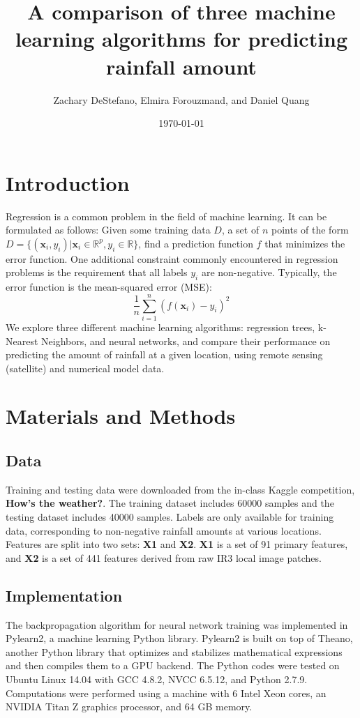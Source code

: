 \documentclass[12pt] {article}
\begin{document}
\title{A comparison of three machine learning algorithms for predicting rainfall amount}
\author{Zachary DeStefano, Elmira Forouzmand, and Daniel Quang}
\date \today
\maketitle
\thispagestyle{empty}
\bigskip
\pagebreak
\setcounter{page}{1}
\section{Introduction}
Regression is a common problem in the field of machine learning. It can be formulated as follows: Given some training data $D$, a set of $n$ points of the form $D=\{(\mathbf{x}_i,y_i) | \mathbf{x}_i \in \mathbb{R}^p, y_i \in \mathbb{R} \}$, find a prediction function $f$ that minimizes the error function. One additional constraint commonly encountered in regression problems is the requirement that all labels $y_i$ are non-negative. Typically, the error function is the mean-squared error (MSE): 
$$\frac{1}{n}\sum_{i=1}^n\left(f(\mathbf{x}_i)-y_i\right)^2$$
We explore three different machine learning algorithms: regression trees, k-Nearest Neighbors, and neural networks, and compare their performance on predicting the amount of rainfall at a given location, using remote sensing (satellite) and numerical model data. 
\section{Materials and Methods}
\subsection{Data}
Training and testing data were downloaded from the in-class Kaggle competition, \textbf{How's the weather?}. The training dataset includes 60000 samples and the testing dataset includes 40000 samples. Labels are only available for training data, corresponding to non-negative rainfall amounts at various locations. Features are split into two sets: \textbf{X1} and \textbf{X2}. \textbf{X1} is a set of 91 primary features, and \textbf{X2} is a set of 441 features derived from raw IR3 local image patches.   

\subsection{Implementation}
The backpropagation algorithm for neural network training was implemented in Pylearn2, a machine learning Python library. Pylearn2 is built on top of Theano, another Python library that optimizes and stabilizes mathematical expressions and then compiles them to a GPU backend. The Python codes were tested on Ubuntu Linux 14.04 with GCC 4.8.2, NVCC 6.5.12, and Python 2.7.9. Computations were performed using a machine with 6 Intel Xeon cores, an NVIDIA Titan Z graphics processor, and 64 GB memory.
\end{document}
